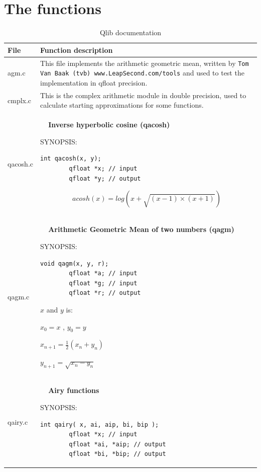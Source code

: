 \documentclass[10pt,a4paper,x11names]{memoir} %
\newcounter{entry}
\newcommand{\TOC}[1] {\addcontentsline{toc}{section}{\theentry\ \  #1} \textbf{\theentry\ \  #1} \par\stepcounter{entry}}
\begin{document}
\chapter{The functions}
\begin{longtable}{|p{1.5cm}|p{11.5cm}|}
	\caption{Qlib documentation}\\\hline
	\textbf{File}&\textbf{Function description}\\\hline\hline
	\endhead
	
	agm.c&This file implements the arithmetic geometric mean, written by 
	\verb,Tom Van Baak (tvb) www.LeapSecond.com/tools, and used to test the implementation in qfloat precision.\\\hline
	cmplx.c& This is the complex arithmetic module in double precision, used to calculate starting approximations for some functions.\\\hline
	qacosh.c& \TOC{Inverse hyperbolic cosine (qacosh)}
	
	{\footnotesize SYNOPSIS:}\vspace{-0.25cm}\index{qacosh}
	\begin{lstlisting}[numbers=none]
		int qacosh(x, y);
		qfloat *x; // input
		qfloat *y; // output
	\end{lstlisting}\vspace{-0.2cm}
	\par
	$$acosh(x) = log \left(x + \sqrt{(x-1)\times (x+1)}\right)$$
	\\\hline
	qagm.c & \TOC{Arithmetic Geometric Mean of two numbers (qagm)}
	
	{\footnotesize SYNOPSIS:}\vspace{-0.2cm}\index{qagm}
	\begin{lstlisting}[numbers=none]
		void qagm(x, y, r);
		qfloat *a; // input
		qfloat *g; // input
		qfloat *r; // output
	\end{lstlisting}\vspace{-0.2cm}
	
	 $x$ and $y$ is:\par
	$x_0 = x$ , 
	$y_0 = y$ \par
	$x_{n+1} = \frac{1}{2}  (x_n + y_n)$\par
	$y_{n+1} = \sqrt{x_n - y_n}$
	\\\hline
	qairy.c & \TOC{Airy functions}
	
	{\footnotesize SYNOPSIS:}\vspace{-0.2cm}\index{qairy}
	\begin{lstlisting}[numbers=none]
		int qairy( x, ai, aip, bi, bip );
		qfloat *x; // input
		qfloat *ai, *aip; // output
		qfloat *bi, *bip; // output
	\end{lstlisting}\vspace{-0.2cm}
	

\end{longtable}
\end{document}

